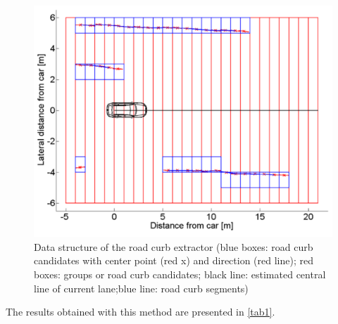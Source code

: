 \documentclass[conference]{IEEEtran}
\begin{document}
\begin{figure}[H]
	\centering
  	\includegraphics[scale = 0.4]{pictures/extractor.pdf}
	\caption{Data structure of the road curb extractor (blue boxes: road curb candidates with center point (red x) and direction (red line); red boxes: groups or road curb candidates; black line: estimated central line of current lane;blue line: road curb segments) \cite{lidar13}}
	\label{fig5}
\end{figure}


The results obtained with this method are presented in \ref{tab1}.

\begin{table}[]
\centering
\caption{FPR and TPR Evaluation}
\label{tab1}
\end{table}
\end{document}
